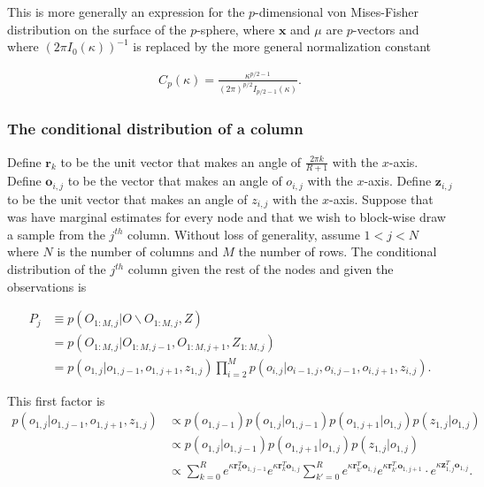\documentclass[11pt]{article}
\begin{document}
\noindent This is more generally an expression for the $p$-dimensional von Mises-Fisher distribution on the surface of the $p$-sphere, where $\mathbf{x}$ and $\mu$ are $p$-vectors and where $(2\pi I_0(\kappa))^{-1}$ is replaced by the more general normalization constant 

\begin{align*}
C_p(\kappa)=\frac{\kappa^{p/2-1}}{(2\pi)^{p/2} I_{p/2-1}(\kappa)}.
\end{align*}

\subsubsection*{The conditional distribution of a column}

Define $\mathbf{r}_k$ to be the unit vector that makes an angle of $\frac{2\pi k}{R+1}$ with the $x$-axis. Define $\mathbf{o}_{i,j}$ to be the vector that makes an angle of $o_{i,j}$ with the $x$-axis. Define $\mathbf{z}_{i,j}$ to be the unit vector that makes an angle of $z_{i,j}$ with the $x$-axis. Suppose that was have marginal estimates for every node and that we wish to block-wise draw a sample from the $j^{th}$ column. Without loss of generality, assume $1<j<N$ where $N$ is the number of columns and $M$ the number of rows. The conditional distribution of the $j^{th}$ column given the rest of the nodes and given the observations is

\begin{align*}
P_j &\equiv p(O_{1:M,j}|O\backslash O_{1:M,j},Z) \\
&= p(O_{1:M,j}|O_{1:M,j-1},O_{1:M,j+1},Z_{1:M,j}) \\
&= p(o_{1,j}|o_{1,j-1},o_{1,j+1},z_{1,j}) \prod_{i=2}^M p(o_{i,j}|o_{i-1,j},o_{i,j-1},o_{i,j+1},z_{i,j}).
\end{align*}

\noindent This first factor is
%
\begin{align*}
p(o_{1,j}|o_{1,j-1},o_{1,j+1},z_{1,j}) &\propto p(o_{1,j-1}) p(o_{1,j}|o_{1,j-1})p(o_{1,j+1}|o_{1,j})p(z_{1,j}|o_{1,j}) \\
&\propto p(o_{1,j}|o_{1,j-1})p(o_{1,j+1}|o_{1,j})p(z_{1,j}|o_{1,j}) \\
&\propto \sum_{k=0}^R e^{\kappa \mathbf{r}_k^T \mathbf{o}_{1,j-1}} e^{\kappa \mathbf{r}_k^T \mathbf{o}_{1,j}}
\sum_{k'=0}^R e^{\kappa \mathbf{r}_{k'}^T \mathbf{o}_{1,j}} e^{\kappa \mathbf{r}_{k'}^T \mathbf{o}_{1,j+1}}
\cdot e^{\kappa \mathbf{z}_{1,j}^T\mathbf{o}_{1,j} }.
\end{align*}
\end{document}
